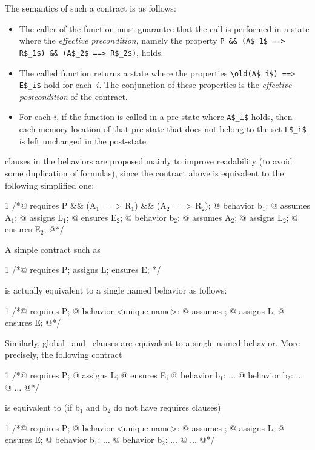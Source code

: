 The semantics of such a contract is as follows:
\begin{itemize}
\item The caller of the function must guarantee that the call is
  performed in a state where the \emph{effective precondition}, namely the property
  \lstinline|P && (A$_1$ ==> R$_1$) && (A$_2$ ==> R$_2$)|, holds.
\item The called function returns a state where
the properties \lstinline|\old(A$_i$) ==> E$_i$| hold for each~$i$.
The conjunction of these properties is the \emph{effective postcondition} of the contract.
\item For each $i$, if the function is called in a pre-state where
  \lstinline|A$_i$| holds, then each memory location of that pre-state
  that does not belong to the set \lstinline|L$_i$| is left unchanged in
  the post-state.
\end{itemize}


\requires{} clauses in the behaviors are proposed
mainly to improve readability (to avoid some duplication of
formulas), since the contract above is equivalent to the following
simplified one:
\begin{listing}{1}
/*@ requires P && (A$_1$ ==> R$_1$) && (A$_2$ ==> R$_2$);
  @ behavior b$_1$:
  @   assumes A$_1$;
  @   assigns L$_1$;
  @   ensures E$_2$;
  @ behavior b$_2$:
  @   assumes A$_2$;
  @   assigns L$_2$;
  @   ensures E$_2$;
  @*/
\end{listing}

A simple contract such as
\begin{listing}{1}
/*@ requires P; assigns L; ensures E; */
\end{listing}
is actually equivalent to a single named behavior as follows:
\begin{listing}{1}
/*@ requires P;
  @ behavior <unique name>:
  @   assumes \true;
  @   assigns L;
  @   ensures E;
  @*/
\end{listing}
Similarly, global \assigns\ and \ensures\ clauses are equivalent to a
single named behavior. More precisely, the following contract
\begin{listing}{1}
/*@ requires P;
  @ assigns L;
  @ ensures E;
  @ behavior b$_1$: $\dots$
  @ behavior b$_2$: $\dots$
  @ $\dots$
  @*/
\end{listing}
is equivalent to (if b$_1$ and b$_2$ do not have requires clauses)
\begin{listing}{1}
/*@ requires P;
  @ behavior <unique name>:
  @   assumes \true;
  @   assigns L;
  @   ensures E;
  @ behavior b$_1$: $\dots$
  @ behavior b$_2$: $\dots$
  @ $\dots$
  @*/
\end{listing}

